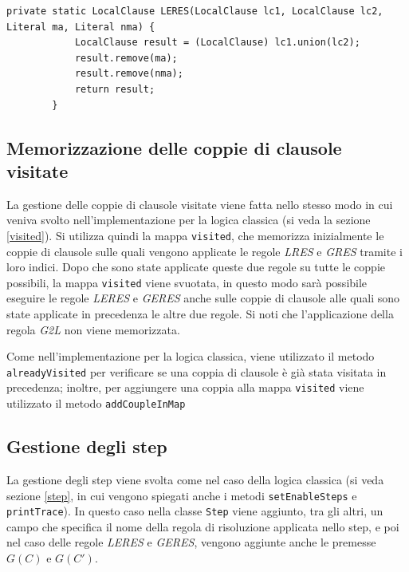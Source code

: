 \documentclass[a4paper,12pt]{report}
\begin{document}
\begin{minipage}{\linewidth}
    \small
    \begin{lstlisting}[caption={Metodo \texttt{LERES} della classe \texttt{Resolution}}, label={method:LERES}]
        private static LocalClause LERES(LocalClause lc1, LocalClause lc2, Literal ma, Literal nma) {
            LocalClause result = (LocalClause) lc1.union(lc2);
            result.remove(ma);
            result.remove(nma);
            return result;
        }
    \end{lstlisting}
\end{minipage}

\subsection*{Memorizzazione delle coppie di clausole visitate}
La gestione delle coppie di clausole visitate viene fatta nello stesso modo in cui veniva svolto nell'implementazione per la logica classica (si veda la sezione \ref{visited}). Si utilizza quindi la mappa \texttt{visited}, che memorizza inizialmente le coppie di clausole sulle quali vengono applicate le regole \emph{LRES} e \emph{GRES} tramite i loro indici. Dopo che sono state applicate queste due regole su tutte le coppie possibili, la mappa \texttt{visited} viene svuotata, in questo modo sarà possibile eseguire le regole \emph{LERES} e \emph{GERES} anche sulle coppie di clausole alle quali sono state applicate in precedenza le altre due regole. Si noti che l'applicazione della regola \emph{G2L} non viene memorizzata.

Come nell'implementazione per la logica classica, viene utilizzato il metodo \\ \texttt{alreadyVisited} per verificare se una coppia di clausole è già stata visitata in precedenza; inoltre, per aggiungere una coppia alla mappa \texttt{visited} viene utilizzato il metodo \texttt{addCoupleInMap}

\subsection{Gestione degli step}
La gestione degli step viene svolta come nel caso della logica classica (si veda sezione \ref{step}, in cui vengono spiegati anche i metodi \texttt{setEnableSteps} e \texttt{printTrace}). In questo caso nella classe \texttt{Step} viene aggiunto, tra gli altri, un campo che specifica il nome della regola di risoluzione applicata nello step, e poi nel caso delle regole \emph{LERES} e \emph{GERES}, vengono aggiunte anche le premesse $G(C)$ e $G(C')$.
\end{document}
